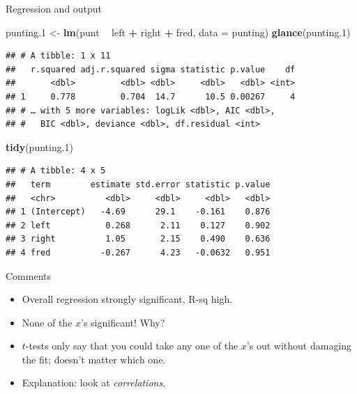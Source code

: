 \documentclass[ignorenonframetext,]{beamer}
\newenvironment{Shaded}{\begin{snugshade}}{\end{snugshade}}
\newcommand{\DataTypeTok}[1]{\textcolor[rgb]{0.13,0.29,0.53}{#1}}
\newcommand{\FloatTok}[1]{\textcolor[rgb]{0.00,0.00,0.81}{#1}}
\newcommand{\KeywordTok}[1]{\textcolor[rgb]{0.13,0.29,0.53}{\textbf{#1}}}
\newcommand{\NormalTok}[1]{#1}
\newcommand{\OperatorTok}[1]{\textcolor[rgb]{0.81,0.36,0.00}{\textbf{#1}}}
\newcommand{\StringTok}[1]{\textcolor[rgb]{0.31,0.60,0.02}{#1}}
\begin{document}
\begin{frame}[fragile]{Regression and output}
\protect\hypertarget{regression-and-output}{}

\small

\begin{Shaded}
\begin{Highlighting}[]
\NormalTok{punting}\FloatTok{.1}\NormalTok{ <-}\StringTok{ }\KeywordTok{lm}\NormalTok{(punt }\OperatorTok{~}\StringTok{ }\NormalTok{left }\OperatorTok{+}\StringTok{ }\NormalTok{right }\OperatorTok{+}\StringTok{ }\NormalTok{fred, }\DataTypeTok{data =}\NormalTok{ punting)}
\KeywordTok{glance}\NormalTok{(punting}\FloatTok{.1}\NormalTok{)}
\end{Highlighting}
\end{Shaded}

\begin{verbatim}
## # A tibble: 1 x 11
##   r.squared adj.r.squared sigma statistic p.value    df
##       <dbl>         <dbl> <dbl>     <dbl>   <dbl> <int>
## 1     0.778         0.704  14.7      10.5 0.00267     4
## # … with 5 more variables: logLik <dbl>, AIC <dbl>,
## #   BIC <dbl>, deviance <dbl>, df.residual <int>
\end{verbatim}

\begin{Shaded}
\begin{Highlighting}[]
\KeywordTok{tidy}\NormalTok{(punting}\FloatTok{.1}\NormalTok{)}
\end{Highlighting}
\end{Shaded}

\begin{verbatim}
## # A tibble: 4 x 5
##   term        estimate std.error statistic p.value
##   <chr>          <dbl>     <dbl>     <dbl>   <dbl>
## 1 (Intercept)   -4.69      29.1    -0.161    0.876
## 2 left           0.268      2.11    0.127    0.902
## 3 right          1.05       2.15    0.490    0.636
## 4 fred          -0.267      4.23   -0.0632   0.951
\end{verbatim}

\normalsize

\end{frame}

\begin{frame}{Comments}
\protect\hypertarget{comments-8}{}

\begin{itemize}
\item
  Overall regression strongly significant, R-sq high.
\item
  None of the \(x\)'s significant! Why?
\item
  \(t\)-tests only say that you could take any one of the \(x\)'s out
  without damaging the fit; doesn't matter which one.
\item
  Explanation: look at \emph{correlations}.
\end{itemize}

\end{frame}
\end{document}
